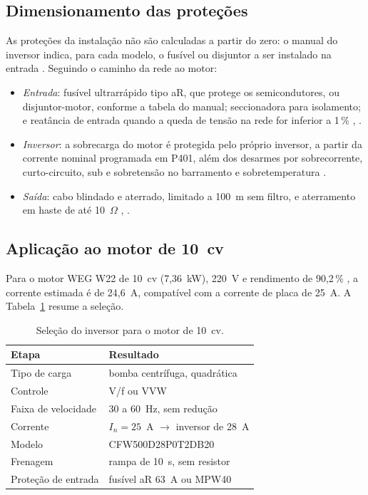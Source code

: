 \documentclass[conference]{IEEEtran}
\begin{document}
\subsection{Dimensionamento das proteções}

As proteções da instalação não são calculadas a partir do zero: o manual do inversor indica, para cada modelo, o fusível ou disjuntor a ser instalado na entrada \cite{b10}. Seguindo o caminho da rede ao motor:

\begin{itemize}
    \item \textit{Entrada}: fusível ultrarrápido tipo aR, que protege os semicondutores, ou disjuntor-motor, conforme a tabela do manual; seccionadora para isolamento; e reatância de entrada quando a queda de tensão na rede for inferior a 1\,\% \cite{b4}, \cite{b10}.
    \item \textit{Inversor}: a sobrecarga do motor é protegida pelo próprio inversor, a partir da corrente nominal programada em P401, além dos desarmes por sobrecorrente, curto-circuito, sub e sobretensão no barramento e sobretemperatura \cite{b5}.
    \item \textit{Saída}: cabo blindado e aterrado, limitado a 100~m sem filtro, e aterramento em haste de até 10~$\Omega$ \cite{b4}, \cite{b8}.
\end{itemize}

\subsection{Aplicação ao motor de 10~cv}

Para o motor WEG W22 de 10~cv (7,36~kW), 220~V e rendimento de 90,2\,\% \cite{b12}, a corrente estimada é de 24,6~A, compatível com a corrente de placa de 25~A. A Tabela~\ref{tab:selecao} resume a seleção.

\begin{table}[H]
\centering
\caption{Seleção do inversor para o motor de 10~cv.}
\label{tab:selecao}
\begin{tabular}{ll}
\hline
\textbf{Etapa} & \textbf{Resultado} \\
\hline
Tipo de carga & bomba centrífuga, quadrática \\
Controle & V/f ou VVW \\
Faixa de velocidade & 30 a 60~Hz, sem redução \\
Corrente & $I_n=25$~A $\rightarrow$ inversor de 28~A \\
Modelo & CFW500D28P0T2DB20 \cite{b10} \\
Frenagem & rampa de 10~s, sem resistor \\
Proteção de entrada & fusível aR 63~A ou MPW40 \cite{b10} \\
\hline
\end{tabular}
\end{table}
\end{document}
